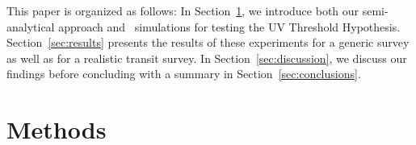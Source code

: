 \documentclass[twocolumn,twocolappendix,linenumbers]{aastex631}
\begin{document}
This paper is organized as follows:
In Section~\ref{sec:methods}, we introduce both our semi-analytical approach and \bioverse\ simulations for testing the UV Threshold Hypothesis.
Section~\ref{sec:results} presents the results of these experiments for a generic survey as well as for a realistic transit survey.
In Section~\ref{sec:discussion}, we discuss our findings before concluding with a summary in Section~\ref{sec:conclusions}.

%


\section{Methods}
\label{sec:methods}
\end{document}
